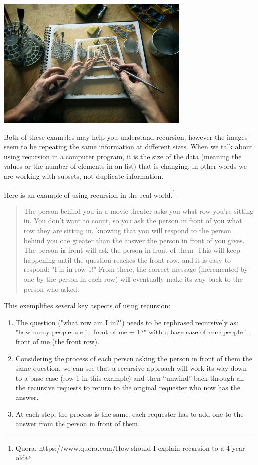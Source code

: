 \beforefig
\centerline{\includegraphics[height=2.5in]{images/recursion_quora.jpg}}
\afterfig

Both of these examples may help you understand recursion, however the images seem to be repeating the same information at different sizes. When we talk about using recursion in a computer program, it is the size of the data (meaning the values or the number of elements in an list) that is changing. In other words we are working with subsets, not duplicate information.

Here is an example of using recursion in the real world.\footnote{Quora, https://www.quora.com/How-should-I-explain-recursion-to-a-4-year-old} 

\begin{quotation}
The person behind you in a movie theater asks you what row you're sitting in. You don't want to count, so you ask the person in front of you what row they are sitting in, knowing that you will respond to the person behind you one greater than the answer the person in front of you gives. The person in front will ask the person in front of them. This will keep happening until the question reaches the front row, and it is easy to respond: "I'm in row 1!" From there, the correct message (incremented by one by the person in each row) will eventually make its way back to the person who asked.
\end{quotation}

\pagebreak

This exemplifies several key aspects of using recursion:
    
\begin{enumerate}
    \item The question ("what row am I in?") needs to be rephrased recursively as: "how many people are in front of me + 1?" with a base case of zero people in front of me (the front row).
    
    \item Considering the process of each person asking the person in front of them the same question, we can see that a recursive approach will work its way down to a base case (row 1 in this example) and then ``unwind'' back through all the recursive requests to return to the original requester who now has the answer.
    
    \item At each step, the process is the same, each requester has to add one to the answer from the person in front of them.
    
\end{enumerate}    

